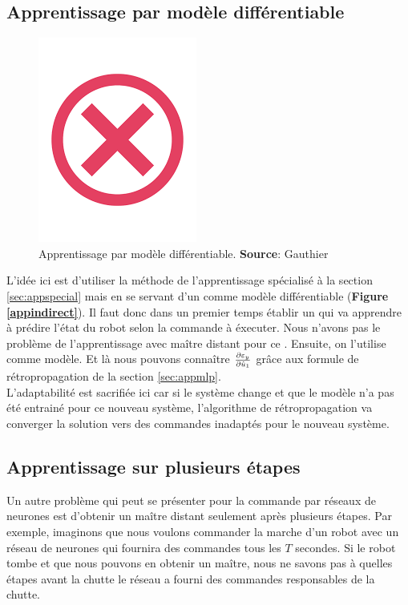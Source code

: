 \subsection{Apprentissage par modèle différentiable}\label{sec:appmodele}
\begin{figure}
 \centering
 \includegraphics[scale=0.5]{../figures/invalid.png}
 \caption{Apprentissage par modèle différentiable. \textbf{Source}: Gauthier\cite{Gauthier}}
 \label{appmodele}
\end{figure}

L'idée ici est d'utiliser la méthode de l'apprentissage spécialisé à la section \ref{sec:appspecial} mais en se servant d'un \rna comme modèle différentiable (\textbf{Figure \ref{appindirect}}).
Il faut donc dans un premier temps établir un \rna qui va apprendre à prédire l'état du robot selon la commande à éxecuter.
Nous n'avons pas le problème de l'apprentissage avec maître distant pour ce \rna.
Ensuite, on l'utilise comme modèle. Et là nous pouvons connaître $\frac{\partial \varepsilon_y}{\partial \hat{u}_1}$ grâce aux formule de rétropropagation de la section \ref{sec:appmlp}.\\

L'adaptabilité est sacrifiée ici car si le système change et que le modèle n'a pas été entrainé pour ce nouveau système, l'algorithme de rétropropagation va converger la solution vers des commandes inadaptés pour le nouveau système.

\subsection{Apprentissage sur plusieurs étapes}
Un autre problème qui peut se présenter pour la commande par réseaux de neurones est d'obtenir un maître distant seulement après plusieurs étapes.
Par exemple, imaginons que nous voulons commander la marche d'un robot avec un réseau de neurones qui fournira des commandes tous les $T$ secondes.
Si le robot tombe et que nous pouvons en obtenir un maître, nous ne savons pas à quelles étapes avant la chutte le réseau a fourni des commandes responsables de la chutte.\\

